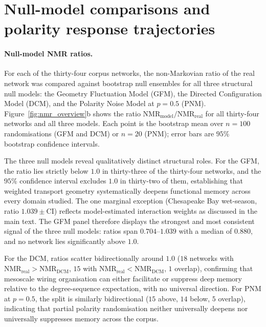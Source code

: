 \documentclass[aps,superscriptaddress,11pt]{revtex4-2}
\newcommand{\NMR}{\mathrm{NMR}}
\theoremstyle{definition}
\theoremstyle{plain}
\begin{document}
\section{Null-model comparisons and polarity response trajectories}
\label{sec:nmr_nullmodels}

\paragraph{Null-model NMR ratios.}
For each of the thirty-four corpus networks, the non-Markovian ratio of
the real network was compared against bootstrap null ensembles for all
three structural null models: the Geometry Fluctuation Model (GFM), the
Directed Configuration Model (DCM), and the Polarity Noise Model at
$p=0.5$ (PNM).  Figure~\ref{fig:nmr_overview}b shows the ratio
$\NMR_{\mathrm{model}}/\NMR_{\mathrm{real}}$ for all thirty-four networks
and all three models.  Each point is the bootstrap mean over $n=100$
randomisations (GFM and DCM) or $n=20$ (PNM); error bars are $95\%$
bootstrap confidence intervals.

The three null models reveal qualitatively distinct structural roles.
For the GFM, the ratio lies strictly below $1.0$ in thirty-three of the
thirty-four networks, and the $95\%$ confidence interval excludes $1.0$ in
thirty-two of them, establishing that weighted transport geometry
systematically deepens functional memory across every domain studied.
The one marginal exception (Chesapeake Bay wet-season, ratio
$1.039 \pm \mathrm{CI}$) reflects model-estimated interaction weights as
discussed in the main text.  The GFM panel therefore displays the
strongest and most consistent signal of the three null models: ratios span
$0.704$--$1.039$ with a median of $0.880$, and no network lies
significantly above $1.0$.

For the DCM, ratios scatter bidirectionally around $1.0$ ($18$ networks
with $\NMR_{\mathrm{real}} > \NMR_{\mathrm{DCM}}$, $15$ with
$\NMR_{\mathrm{real}} < \NMR_{\mathrm{DCM}}$, $1$ overlap), confirming
that mesoscale wiring organisation can either facilitate or suppress deep
memory relative to the degree-sequence expectation, with no universal
direction.  For PNM at $p=0.5$, the split is similarly bidirectional
($15$ above, $14$ below, $5$ overlap), indicating that partial polarity
randomisation neither universally deepens nor universally suppresses
memory across the corpus.
\end{document}
